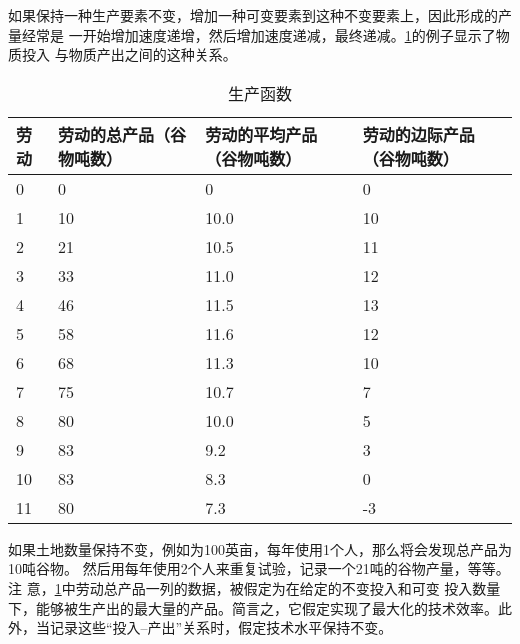 如果保持一种生产要素不变，增加一种可变要素到这种不变要素上，因此形成的产量经常是
一开始增加速度递增，然后增加速度递减，最终递减。\cref{tab:productfunc}的例子显示了物质投入
与物质产出之间的这种关系。

\begin{table}[htbp]
  \centering
  \caption{生产函数}
  \label{tab:productfunc}
  \small
  \begin{tabularx}{\linewidth}{@{}XXXX@{}}
    \toprule
    劳动 & 劳动的总产品\newline（谷物吨数） & 劳动的平均产品\newline（谷物吨数） & 劳动的边际产品\newline（谷物吨数） \\ \midrule
    0 & 0 & 0 & 0 \\
    1 & 10 & 10.0 & 10 \\
    2 & 21 & 10.5 & 11 \\
    3 & 33 & 11.0 & 12 \\
    4 & 46 & 11.5 & 13 \\
    5 & 58 & 11.6 & 12 \\
    6 & 68 & 11.3 & 10 \\
    7 & 75 & 10.7 &  7\\
    8 & 80 & 10.0 &  5\\
    9 & 83 &  9.2 &  3\\
    10 & 83 &  8.3 &  0\\
    11 & 80 &  7.3 &  -3\\ \bottomrule
  \end{tabularx}%
\end{table}

如果土地数量保持不变，例如为100英亩，每年使用1个人，那么将会发现总产品为10吨谷物。
然后用每年使用2个人来重复试验，记录一个21吨的谷物产量，等等。注
意，\cref{tab:productfunc}中劳动总产品一列的数据，被假定为在给定的不变投入和可变
投入数量下，能够被生产出的最大量的产品。简言之，它假定实现了最大化的技术效率。此
外，当记录这些“投入--产出”关系时，假定技术水平保持不变。

